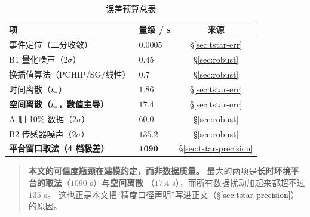 \begin{table}[H]
  \centering
  \caption{误差预算总表}
  \label{tab:budget}
  \footnotesize
  \begin{tabular}{@{}llc@{}}
    \toprule
    项 & 量级 / s & 来源 \\
    \midrule
    事件定位（二分收敛） & $0.0005$ & \S\ref{sec:tstar-err} \\
    B1 量化噪声（$2\sigma$） & $0.45$ & \S\ref{sec:robust} \\
    换插值算法（PCHIP/SG/线性） & $0.7$ & \S\ref{sec:robust} \\
    时间离散（$t_{*}$） & $1.86$ & \S\ref{sec:tstar-err} \\
    \textbf{空间离散（$t_{*}$，数值主导）} & $\mathbf{17.4}$ & \S\ref{sec:tstar-err} \\
    A 删 10\% 数据（$2\sigma$） & $60.0$ & \S\ref{sec:robust} \\
    B2 传感器噪声（$2\sigma$） & $135.2$ & \S\ref{sec:robust} \\
    \textbf{平台窗口取法（4 档极差）} & $\mathbf{1090}$ & \S\ref{sec:tstar-precision} \\
    \bottomrule
  \end{tabular}
\end{table}

\begin{quote}
  \textbf{本文的可信度瓶颈在建模约定，而非数据质量。}
  最大的两项是\textbf{长时环境平台的取法}（$1090$ s）与\textbf{空间离散}
  （$17.4$ s），而所有数据扰动加起来都超不过 $135$ s。
  这也正是本文把``精度口径声明''写进正文（\S\ref{sec:tstar-precision}）的原因。
\end{quote}
